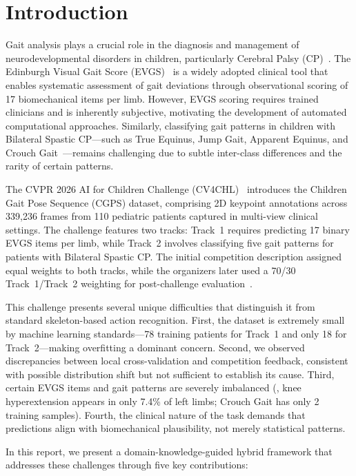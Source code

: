 \section{Introduction}
\label{sec:intro}

Gait analysis plays a crucial role in the diagnosis and management of neurodevelopmental disorders in children, particularly Cerebral Palsy (CP)~\cite{gage2009treatment}. The Edinburgh Visual Gait Score (EVGS)~\cite{read2003edinburgh} is a widely adopted clinical tool that enables systematic assessment of gait deviations through observational scoring of 17 biomechanical items per limb. However, EVGS scoring requires trained clinicians and is inherently subjective, motivating the development of automated computational approaches. Similarly, classifying gait patterns in children with Bilateral Spastic CP---such as True Equinus, Jump Gait, Apparent Equinus, and Crouch Gait~\cite{winters1987gait, rodda2004classification}---remains challenging due to subtle inter-class differences and the rarity of certain patterns.

The CVPR 2026 AI for Children Challenge (CV4CHL)~\cite{cv4chl2026} introduces the Children Gait Pose Sequence (CGPS) dataset, comprising 2D keypoint annotations across 339,236 frames from 110 pediatric patients captured in multi-view clinical settings. The challenge features two tracks: Track~1 requires predicting 17 binary EVGS items per limb, while Track~2 involves classifying five gait patterns for patients with Bilateral Spastic CP. The initial competition description assigned equal weights to both tracks, while the organizers later used a 70/30 Track~1/Track~2 weighting for post-challenge evaluation~\cite{cv4chl2026}.

This challenge presents several unique difficulties that distinguish it from standard skeleton-based action recognition. First, the dataset is extremely small by machine learning standards---78 training patients for Track~1 and only 18 for Track~2---making overfitting a dominant concern. Second, we observed discrepancies between local cross-validation and competition feedback, consistent with possible distribution shift but not sufficient to establish its cause. Third, certain EVGS items and gait patterns are severely imbalanced (\eg, knee hyperextension appears in only 7.4\% of left limbs; Crouch Gait has only 2 training samples). Fourth, the clinical nature of the task demands that predictions align with biomechanical plausibility, not merely statistical patterns.

In this report, we present a domain-knowledge-guided hybrid framework that addresses these challenges through five key contributions:

